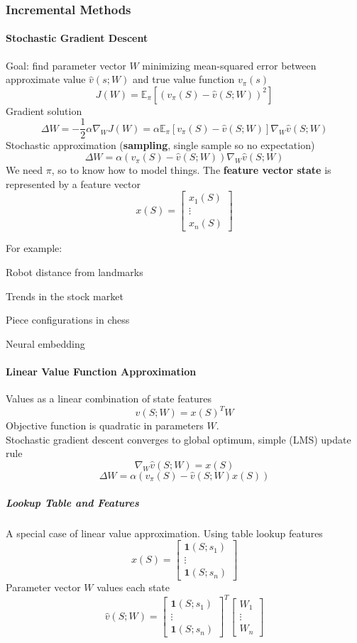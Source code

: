 \documentclass[10pt]{report}
\begin{document}
\subsubsection{Incremental Methods}
\paragraph{Stochastic Gradient Descent} Goal: find parameter vector $W$ minimizing mean-squared error between approximate value $\hat{v}(s;W)$ and true value function $v_\pi(s)$
$$J(W) = \mathbb{E}_\pi[(v_\pi(S)-\hat{v}(S;W))^2]$$
Gradient solution
$$\Delta W= -\frac{1}{2}\alpha\nabla_{W}J(W) = \alpha \mathbb{E}_\pi[v_\pi(S) - \hat{v}(S;W)]\nabla_W\hat{v}(S;W)$$
Stochastic approximation (\textbf{sampling}, single sample so no expectation)
$$\Delta W=\alpha(v_\pi(S)-\hat{v}(S;W))\nabla_W\hat{v}(S;W)$$
We need $\pi$, so to know how to model things. The \textbf{feature vector state} is represented by a feature vector
$$x(S)=\left[\begin{array}{c}
x_1(S)\\\vdots\\x_n(S)
\end{array}\right]$$
\pagebreak

For example:
\begin{list}{}{}
	\item Robot distance from landmarks
	\item Trends in the stock market
	\item Piece configurations in chess
	\item Neural embedding
\end{list}
\paragraph{Linear Value Function Approximation} Values as a linear combination of state features $$\hat{v}(S;W) = x(S)^TW$$
Objective function is quadratic in parameters $W$.\\
Stochastic gradient descent converges to global optimum, simple (LMS) update rule
$$\nabla_W\hat{v}(S;W)=x(S)$$
$$\Delta W=\alpha(v_\pi(S)-\hat{v}(S;W)x(S))$$
\subparagraph{Lookup Table and Features} A special case of linear value approximation. Using table lookup features
$$x(S)=\left[\begin{array}{c}
\mathbf{1}(S;s_1)\\\vdots\\\mathbf{1}(S;s_n)
\end{array}\right]$$
Parameter vector $W$ values each state
$$\hat{v}(S;W)=\left[\begin{array}{c}
\mathbf{1}(S;s_1)\\\vdots\\\mathbf{1}(S;s_n)
\end{array}\right]^T\left[\begin{array}{c}
W_1\\\vdots\\W_n
\end{array}\right]$$
\end{document}
